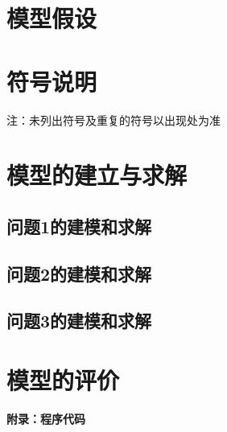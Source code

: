 \documentclass[UTF8]{ctexart}
\begin{document}
\section{模型假设}


\section{符号说明}


\vspace{1em}
\noindent 注：未列出符号及重复的符号以出现处为准

\section{模型的建立与求解}
\subsection{问题1的建模和求解}


\subsection{问题2的建模和求解}


\subsection{问题3的建模和求解}


\section{模型的评价}





\begin{center}
    \Large\textbf{附录：程序代码}
\end{center}


\end{document}
